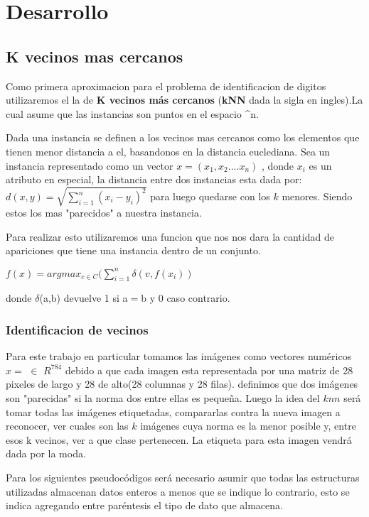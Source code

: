 \section{Desarrollo}
\subsection{K vecinos mas cercanos}
Como primera aproximacion para el problema de identificacion de digitos utilizaremos el la de \textbf{K vecinos más cercanos} (\textbf{kNN} dada la sigla en ingles).La cual asume que las instancias son puntos en el espacio ^n.

Dada una instancia se definen a los vecinos mas cercanos como los elementos que tienen menor distancia a el, basandonos en la distancia euclediana. Sea un instancia representado como un vector $x= (x_1,x_2....x_n)$ , donde $x_i$ es un atributo en especial, la distancia entre dos instancias esta dada por: $d(x,y) = \sqrt{\sum_{i=1}^{n} (x_i - y_i)^2}$ para luego quedarse con los $k$ menores. Siendo estos los mas "parecidos" a nuestra instancia.

Para realizar esto utilizaremos una funcion que nos nos dara la cantidad de apariciones que tiene una instancia dentro de un conjunto.

\begin{center}
$f(x)= argmax_{c \in C} (\sum_{i=1}^{n} \delta(v,f(x_i))$
\end{center}

donde $\delta$(a,b) devuelve 1 si a$=$b y 0 caso contrario. 

\subsubsection{Identificacion de vecinos}
Para este trabajo en particular tomamos las imágenes como vectores numéricos $x=$ $\in$  $R^{784}$ debido a que cada imagen esta representada por una matriz de 28 pixeles de largo y 28 de alto(28 columnas y 28 filas). 
definimos que dos imágenes son "parecidas" si la norma dos entre ellas es pequeña. Luego la idea del $knn$ será tomar todas las imágenes etiquetadas, compararlas contra la nueva imagen a reconocer, ver cuales son las $k$ imágenes cuya norma es la menor posible y, entre esos k vecinos, ver a que clase pertenecen. La etiqueta para esta imagen vendrá dada por la moda.

Para los siguientes pseudocódigos será necesario asumir que todas las estructuras utilizadas almacenan datos enteros a menos que se indique lo contrario, esto se indica agregando entre paréntesis el tipo de dato que almacena.


